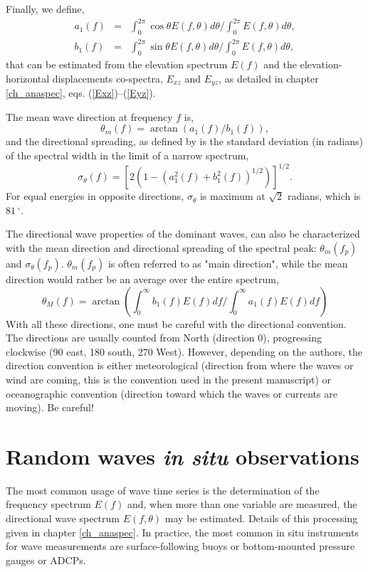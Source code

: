 Finally, we define, 
\begin{eqnarray}
a_{1}(f) & = &\int_{0}^{2\pi} \cos{\theta} E(f,\theta)d\theta /\int_{0}^{2\pi} E(f,\theta)d\theta, \label{a1def} \\
b_{1}(f) & = & \int_{0}^{2\pi} \sin{\theta} E(f,\theta)d\theta /\int_{0}^{2\pi} E(f,\theta)d\theta ,\label{b1def} 
\end{eqnarray}
that can be estimated from the elevation spectrum $E(f)$ and the elevation-horizontal displacements
co-spectra, $E_{xz}$ and  $E_{yz}$, as detailed in chapter \ref{ch_anaspec},   eqs. (\ref{Exz})--(\ref{Eyz}). 

The mean wave direction at frequency $f$ is, 
\begin{equation}
\theta_{m}(f)=\arctan(a_{1}(f)/b_{1}(f)),
\label{eq3.20}
\end{equation}
and the directional spreading, as defined by \cite{Kuik&al.1988} is the standard deviation (in radians) of the spectral width
in the limit of a narrow spectrum,
\begin{equation}
\sigma_{\theta}(f)=\left[2(1-(a_{1}^{2}(f)+b_{1}^{2}(f))^{1/2}) \right]^{1/2}.
\label{eq3.21}
\end{equation}
For equal energies in opposite directions, $\sigma_{\theta}$ is maximum at 
$\sqrt{2}$ radians, which is $81\,^{\circ}$. 

The directional wave properties of the dominant waves, can also be characterized with the 
mean direction and directional spreading of the spectral peak: $\theta_{m}(f_{p})$ and $\sigma_{\theta}(f_{p})$. 
$\theta_{m}(f_{p})$ is often referred to as "main direction", while the mean direction would rather be an average
over the entire spectrum,
\begin{equation}
\theta_{M}(f)=\arctan \left(\int_{0}^{\infty} b_{1}(f) E(f)df/\int_{0}^{\infty} a_{1}(f) E(f)df\right)
\label{eq3.22}
\end{equation}
With all these directions, one must be careful with the directional convention. The directions are usually counted
from North (direction 0), progressing clockwise (90 east, 180 south, 270 West). However, depending on the authors, the direction convention is either meteorological (direction
from where the waves or wind are coming, this is the convention used in the present manuscript) or oceanographic convention
(direction toward which the waves or currents are moving). Be careful!

 

 \section{Random waves \textit{in situ} observations}
 The most common usage of wave time series is the determination of the frequency spectrum $E(f)$ and, when more than 
 one variable are measured, the directional wave spectrum $E(f,\theta)$ may be estimated. Details of this processing 
 given in chapter \ref{ch_anaspec}. In practice, the most common in situ 
 instruments for wave measurements are surface-following buoys or bottom-mounted pressure gauges or ADCPs.  
 

